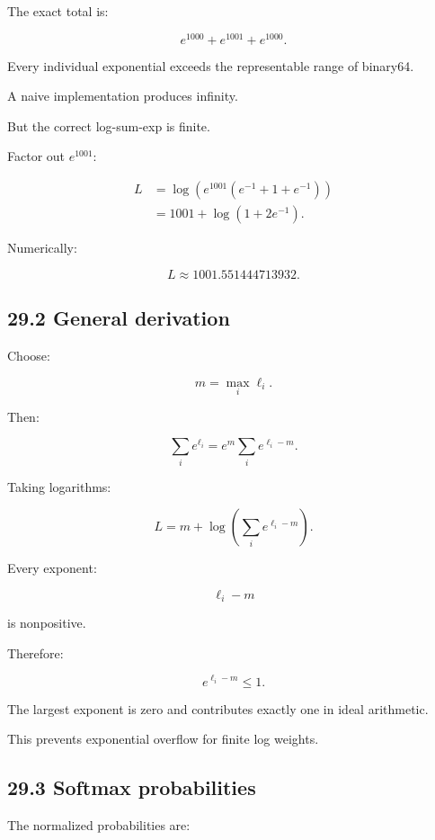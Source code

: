 The exact total is:

\[ e^{1000}+e^{1001}+e^{1000}. \]

Every individual exponential exceeds the representable range of binary64.

A naive implementation produces infinity.

But the correct log-sum-exp is finite.

Factor out \(e^{1001}\):

\[ \begin{aligned} L &= \log\left( e^{1001} (e^{-1}+1+e^{-1}) \right)\\ &= 1001+\log(1+2e^{-1}). \end{aligned} \]

Numerically:

\[ \boxed{ L\approx1001.551444713932 }. \]

\subsection{29.2 General derivation}\label{02-foundations-ii-ch031-general-derivation}

\hypertarget{02-foundations-ii-ch031-general-derivation}{}

Choose:

\[ m=\max_i\ell_i. \]

Then:

\[ \sum_ie^{\ell_i} = e^m\sum_ie^{\ell_i-m}. \]

Taking logarithms:

\[ \boxed{ L= m+\log\left( \sum_ie^{\ell_i-m} \right) }. \]

Every exponent:

\[ \ell_i-m \]

is nonpositive.

Therefore:

\[ e^{\ell_i-m}\le1. \]

The largest exponent is zero and contributes exactly one in ideal arithmetic.

This prevents exponential overflow for finite log weights.

\subsection{29.3 Softmax probabilities}\label{02-foundations-ii-ch031-softmax-probabilities}

\hypertarget{02-foundations-ii-ch031-softmax-probabilities}{}

The normalized probabilities are:

